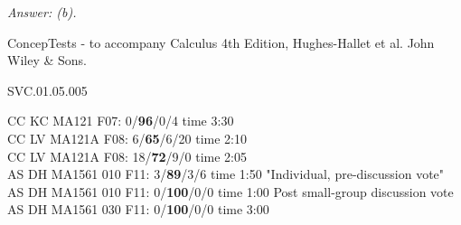 {\it Answer: (b).} 

\medskip
ConcepTests - to accompany Calculus 4th Edition, Hughes-Hallet et al. John Wiley \& Sons.

SVC.01.05.005


CC KC MA121 F07: 0/{\bf 96}/0/4  time 3:30 \\
CC LV MA121A F08: 6/{\bf65}/6/20 time 2:10\\
CC LV MA121A F08: 18/{\bf72}/9/0 time 2:05\\
AS DH MA1561 010 F11: 3/{\bf89}/3/6 time 1:50 "Individual, pre-discussion vote" \\
AS DH MA1561 010 F11: 0/{\bf100}/0/0 time 1:00 Post small-group discussion vote \\
AS DH MA1561 030 F11: 0/{\bf100}/0/0 time 3:00  \\
